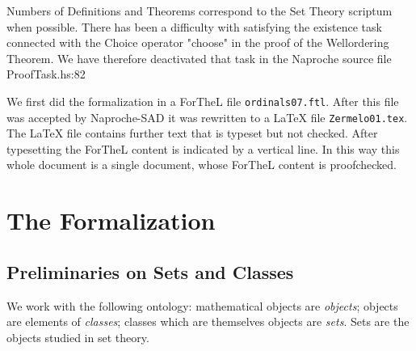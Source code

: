 \documentclass{article}
\begin{document}
Numbers of Definitions and Theorems correspond to the Set Theory scriptum when possible.
There has been a difficulty with satisfying the existence task connected with the Choice operator "choose" in the proof of the Wellordering Theorem.
We have therefore deactivated that task in the Naproche source file
ProofTask.hs:82

We first did the formalization in a ForTheL file {\tt ordinals07.ftl}. After this file was accepted by Naproche-SAD it was rewritten to a {\LaTeX} file
{\tt Zermelo01.tex}. The {\LaTeX} file contains further text that is typeset but not checked. After typesetting the ForTheL content is indicated by a vertical line.  In this way this whole document is a single document, whose ForTheL content is proofchecked.



\section{The Formalization}
\subsection{Preliminaries on Sets and Classes}

We work with the following ontology: mathematical objects are
\emph{objects}; objects are elements of \emph{classes}; 
classes which are themselves objects are \emph{sets}.
Sets are the objects studied in set theory.
\end{document}

